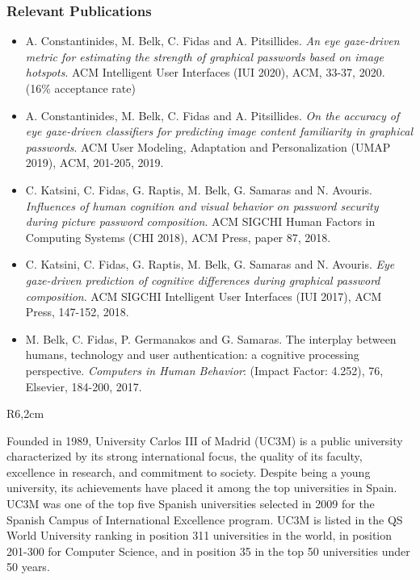 \documentclass[a4paper,11pt]{article}
\begin{document}
\subsubsection*{Relevant Publications}

\begin{itemize}
\item A. Constantinides, M. Belk, C. Fidas and A. Pitsillides. \emph{An eye gaze-driven metric for estimating the strength of graphical passwords based on image hotspots}. ACM Intelligent User Interfaces (IUI 2020), ACM, 33-37, 2020. (16\% acceptance rate)
\item A. Constantinides, M. Belk, C. Fidas and A. Pitsillides. \emph{On the accuracy of eye gaze-driven classifiers for predicting image content familiarity in graphical passwords}. ACM User Modeling, Adaptation and Personalization (UMAP 2019), ACM, 201-205, 2019.
\item C. Katsini, C. Fidas, G. Raptis, M. Belk, G. Samaras and N. Avouris. 
\emph{Influences of human cognition and visual behavior on password security during picture password composition}. ACM SIGCHI Human Factors in Computing Systems (CHI 2018), ACM Press, paper 87, 2018.
\item C. Katsini, C. Fidas, G. Raptis, M. Belk, G. Samaras and N. Avouris. \emph{Eye gaze-driven prediction of cognitive differences during graphical password composition}. ACM SIGCHI Intelligent User Interfaces (IUI 2017), ACM Press, 147-152, 2018.
\item M. Belk, C. Fidas, P. Germanakos and G. Samaras. The interplay between humans, technology and user authentication: a cognitive processing perspective. \emph{Computers in Human Behavior}: (Impact Factor: 4.252), 76, Elsevier, 184-200, 2017.


\end{itemize}


\begin{wrapfigure}{R}{6,2cm}
\vspace{-3cm}
\hfill {}
\vspace{-1cm}
\end{wrapfigure}
\vspace{10pt}

Founded in 1989, University Carlos III of Madrid (UC3M) is a public university characterized by its strong
international focus, the quality of its faculty, excellence in research, and commitment to society. Despite being
a young university, its achievements have placed it among the top universities in Spain. UC3M was one of
the top five Spanish universities selected in 2009 for the Spanish Campus of International Excellence program.
UC3M
is listed in the QS World University ranking in position 311 universities in the world, in position 201-300 for
Computer Science, and in position 35 in the top 50 universities under 50 years. 
\end{document}
